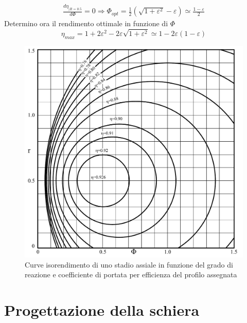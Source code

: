 \begin{align*}
\frac{d\eta_{|R=0.5}}{d \Phi} = 0 \Rightarrow \Phi_{opt} = \frac{1}{2} \left( \sqrt{1 + \varepsilon^2} - \varepsilon \right) \simeq \frac{1 - \varepsilon}{2}
\end{align*}
Determino ora il rendimento ottimale in funzione di $\Phi$
\begin{equation}
\eta_{max} = 1 + 2 \varepsilon^2 - 2 \varepsilon \sqrt{1 + \varepsilon^2} \simeq 1 - 2 \varepsilon \left( 1 - \varepsilon \right)
\end{equation}
\begin{figure}
\centering
  \includegraphics[width=\textwidth]{fig/IsoRendCompAss.pdf}
\caption{Curve isorendimento di uno stadio assiale in funzione del grado di reazione e coefficiente di portata per efficienza del profilo assegnata}
\label{}
\end{figure}

\section{Progettazione della schiera}
